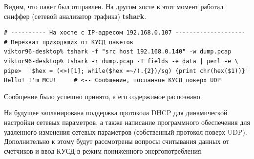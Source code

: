 Видим, что пакет был отправлен. На другом хосте в этот момент работал сниффер (сетевой анализатор трафика) \textbf{tshark}.

\begin{verbatim}
# ---------- На хосте с IP-адресом 192.168.0.107 --------------------
# Перехват приходящих от КУСД пакетов
viktor96-desktop% tshark -f "src host 192.168.0.140" -w dump.pcap 
viktor96-desktop% tshark -r dump.pcap -T fields -e data | perl -e \ 
pipe>  '$hex = (<>)[1]; while($hex =~/(.{2})/sg) {print chr(hex($1))}'
Hello! I'm MCU!		# <-- Сообщение, посланное КУСД поверх UDP
\end{verbatim}

Сообщение было успешно принято, а его содержимое распознано.

На будущее запланирована поддержка протокола DHCP для динамической настройки сетевых параметров, а также написание программного обеспечения для удаленного изменения сетевых параметров (собственный протокол поверх UDP). Дополнительно к этому будут рассмотрены вопросы считывания данных от счетчиков и ввод КУСД в режим пониженного энергопотребления.
